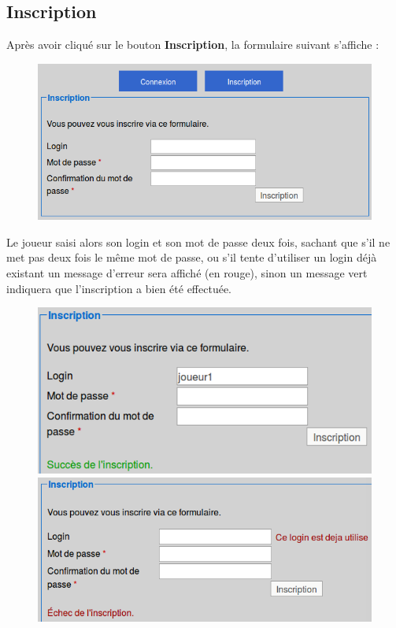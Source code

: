     \subsection{Inscription}
    Après avoir cliqué sur le bouton \textbf{Inscription}, la formulaire suivant s'affiche :
    \begin{figure}[H]
      \center 
      \includegraphics[scale=0.5]{../graph/2-inscription.png} 
    \end{figure}    
    Le joueur saisi alors son login et son mot de passe deux fois, sachant que s'il ne met pas deux fois le même mot de passe, ou s'il tente d'utiliser un login déjà existant un message d'erreur sera affiché (en rouge), sinon un message vert indiquera que l'inscription a bien été effectuée.
    \begin{figure}[H]
      \center 
      \includegraphics[scale=0.36]{../graph/2.1-inscriptionsucces.png} 
      \includegraphics[scale=0.36]{../graph/2.2-inscriptionechec.png} 
    \end{figure}

